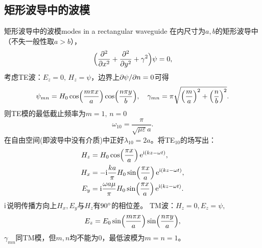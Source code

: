 \subsection{矩形波导中的波模}
\begin{example}{矩形波导中的波模}{modes in a rectangular waveguide}
    在内尺寸为$a,b$的矩形波导中（不失一般性取$a>b$），
    \[
        \Bigkh{\pp[2]x+\pp[2]y+\gamma^2}\psi=0,
    \]
    考虑TE波：$E_z=0,\,H_z=\psi$，边界上$\p\psi/\p n=0$可得
    \[
        \psi_{mn}=H_0\cos\Bigkh{\frac{m\pi x}a}\cos\Bigkh{\frac{n\pi y}b},\quad\gamma_{mn}=\pi\sqrt{\Bigkh{\frac ma}^2+\Bigkh{\frac nb}^2}.
    \]
    则TE模的最低截止频率为$m=1,\,n=0$
    \[
        \omega_{10}=\frac\pi{\sqrt{\mu\varepsilon}a}.
    \]
    在自由空间(即波导中没有介质)中正好$\lambda_{10}=2a$。将TE$_{10}$的场写出：
    \begin{align*}
        H_z&=H_0\cos\Bigkh{\frac{\pi x}a}\e{\i(kz-\omega t)},\\
        H_x&=-\i\frac{ka}\pi H_0\sin\Bigkh{\frac{\pi x}a}\e{\i(kz-\omega t)},\\
        E_y&=\i\frac{\omega a\mu}\pi H_0\sin\Bigkh{\frac{\pi x}a}\e{\i(kz-\omega t)}.
    \end{align*}
    $\i$说明传播方向上$H_x,E_y$与$H_z$有$90\degree$的相位差。
    \tcblower
    TM波：$H_z=0,E_z=\psi,$
    \[
        E_z=E_0\sin\Bigkh{\frac{m\pi x}a}\sin\Bigkh{\frac{n\pi y}a},
    \]
    $\gamma_{mn}$同TM模，但$m,n$均不能为0，最低波模为$m=n=1$。
\end{example}
